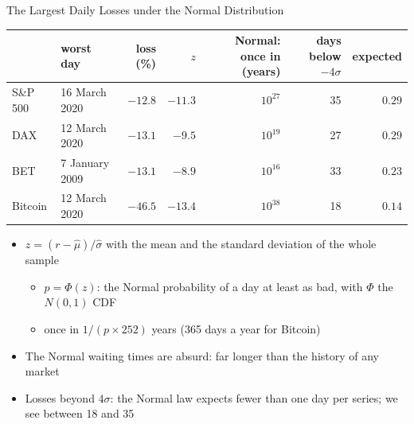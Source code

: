 \begin{frame}{The Largest Daily Losses under the Normal Distribution}
\itemsize{\footnotesize}
\begin{center}
\scriptsize
\begin{tabular}{llrrrrr}
\toprule
& worst day & loss (\%) & $z$ & Normal: once in (years) & days below $-4\sigma$ & expected \\
\midrule
S\&P 500 & 16 March 2020 & ${-12.8}$ & ${-11.3}$ & $10^{27}$ & 35 & $0.29$ \\
DAX & 12 March 2020 & ${-13.1}$ & ${-9.5}$ & $10^{19}$ & 27 & $0.29$ \\
BET & 7 January 2009 & ${-13.1}$ & ${-8.9}$ & $10^{16}$ & 33 & $0.23$ \\
Bitcoin & 12 March 2020 & ${-46.5}$ & ${-13.4}$ & $10^{38}$ & 18 & $0.14$ \\
\bottomrule
\end{tabular}
\end{center}
\begin{itemize}
    \item $z = (r - \hat\mu)/\hat\sigma$ with the mean and the standard deviation of the whole sample
    \begin{itemize}
        \item $p = \Phi(z)$: the Normal probability of a day at least as bad, with $\Phi$ the $N(0, 1)$ CDF
        \item once in $1/(p \times 252)$ years (365 days a year for Bitcoin)
    \end{itemize}
    \item The Normal waiting times are absurd: far longer than the history of any market
    \item Losses beyond $4\sigma$: the Normal law expects fewer than one day per series; we see between 18 and 35
\end{itemize}
\end{frame}

